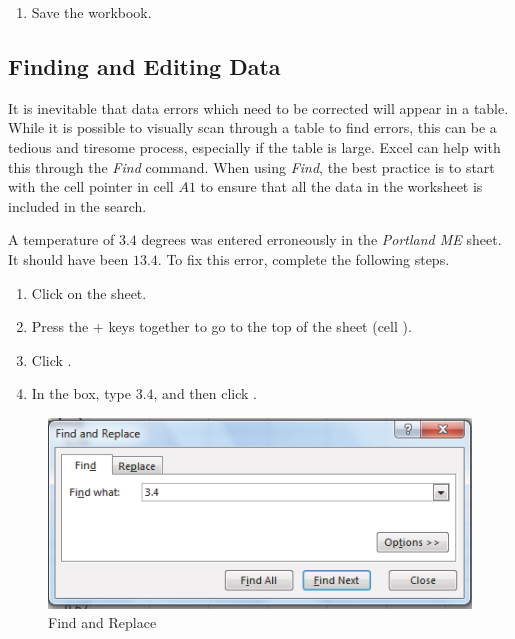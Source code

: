 \begin{enumerate}[resume]
	\item Save the workbook.
\end{enumerate}

\subsection{Finding and Editing Data}

It is inevitable that data errors which need to be corrected will appear in a table. While it is possible to visually scan through a table to find errors, this can be a tedious and tiresome process, especially if the table is large. Excel can help with this through the \textit{Find} command. When using \textit{Find}, the best practice is to start with the cell pointer in cell $ A1 $ to ensure that all the data in the worksheet is included in the search.

A temperature of $ 3.4 $ degrees was entered erroneously in the \textit{Portland ME} sheet. It should have been $ 13.4 $. To fix this error, complete the following steps.

\begin{enumerate}
	\item Click on the  sheet.
	\item Press the + keys together to go to the top of the sheet (cell ).
	\item Click .
	\item In the  box, type $ 3.4 $, and then click .
\end{enumerate}

\begin{figure}[H]
	\centering
	\includegraphics[width=\maxwidth{.95\linewidth}]{gfx/ch05_fig06}
	\caption{Find and Replace}
	\label{05:fig06}
\end{figure}

